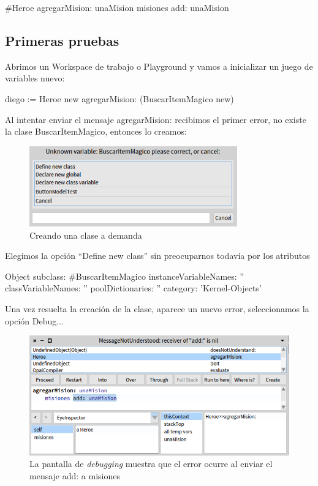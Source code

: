 \documentclass[a4paper,12pt]{book}
\begin{document}
\begin{code}
#Heroe
agregarMision: unaMision
  misiones add: unaMision
\end{code}

\subsection{Primeras pruebas}
Abrimos un Workspace de trabajo o Playground y vamos a inicializar un juego de variables nuevo:

\begin{code}
diego := Heroe new
  agregarMision: (BuscarItemMagico new)
\end{code}

\vspace{\baselineskip}
Al intentar enviar el mensaje agregarMision: recibimos el primer error, no existe la clase BuscarItemMagico,
entonces lo creamos:

\begin{figure}[h!]
    \centering	
    \includegraphics[width=0.8\textwidth]{images/16_crear_nueva_clase.png}
    \caption{Creando una clase a demanda}
\end{figure}
\FloatBarrier

Elegimos la opción ``Define new class'' sin preocuparnos todavía por los atributos

\begin{code}
Object subclass: #BuscarItemMagico
		instanceVariableNames: '' 
		classVariableNames: ''
		poolDictionaries: ''
		category: 'Kernel-Objects'
\end{code}

\vspace{\baselineskip}
Una vez resuelta la creación de la clase, aparece un nuevo error, seleccionamos la opción Debug...

\begin{figure}[h!]
    \centering	
    \includegraphics[width=1\textwidth]{images/11_error_agregarMision.png}
    \caption{La pantalla de \textit{debugging} muestra que el error ocurre al enviar el mensaje add: a misiones}
\end{figure}
\FloatBarrier
\end{document}
